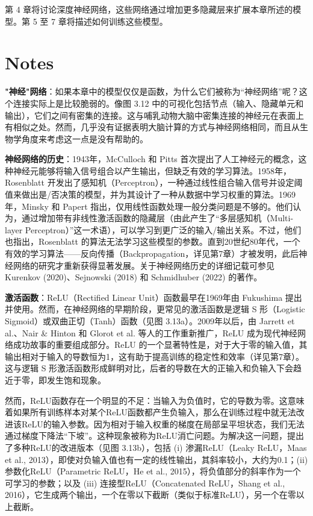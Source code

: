第 4 章将讨论深度神经网络，这些网络通过增加更多隐藏层来扩展本章所述的模型。第 5 至 7 章将描述如何训练这些模型。

\section{Notes}

\textbf{"神经"网络}：如果本章中的模型仅仅是函数，为什么它们被称为“神经网络”呢？这个连接实际上是比较脆弱的。像图 3.12 中的可视化包括节点（输入、隐藏单元和输出），它们之间有密集的连接。这与哺乳动物大脑中密集连接的神经元在表面上有相似之处。然而，几乎没有证据表明大脑计算的方式与神经网络相同，而且从生物学角度来考虑这一点是没有帮助的。

\textbf{神经网络的历史}：1943年，McCulloch 和 Pitts 首次提出了人工神经元的概念，这种神经元能够将输入信号组合以产生输出，但缺乏有效的学习算法。1958年，Rosenblatt 开发出了感知机（Perceptron），一种通过线性组合输入信号并设定阈值来做出是/否决策的模型，并为其设计了一种从数据中学习权重的算法。1969年，Minsky 和 Papert 指出，仅用线性函数处理一般分类问题是不够的。他们认为，通过增加带有非线性激活函数的隐藏层（由此产生了“多层感知机（Multi-layer Perceptron）”这一术语），可以学习到更广泛的输入/输出关系。不过，他们也指出，Rosenblatt 的算法无法学习这些模型的参数。直到20世纪80年代，一个有效的学习算法——反向传播（Backpropagation，详见第7章）才被发明，此后神经网络的研究才重新获得显著发展。关于神经网络历史的详细记载可参见 Kurenkov (2020)、Sejnowski (2018) 和 Schmidhuber (2022) 的著作。

\textbf{激活函数}：ReLU（Rectified Linear Unit）函数最早在1969年由 Fukushima 提出并使用。然而，在神经网络的早期阶段，更常见的激活函数是逻辑 S 形（Logistic Sigmoid）或双曲正切（Tanh）函数（见图 3.13a）。2009年以后，由 Jarrett et al.、Nair \& Hinton 和 Glorot et al. 等人的工作重新推广，ReLU 成为现代神经网络成功故事的重要组成部分。ReLU 的一个显著特性是，对于大于零的输入值，其输出相对于输入的导数恒为1，这有助于提高训练的稳定性和效率（详见第7章）。这与逻辑 S 形激活函数形成鲜明对比，后者的导数在大的正输入和负输入下会趋近于零，即发生饱和现象。

然而，ReLU函数存在一个明显的不足：当输入为负值时，它的导数为零。这意味着如果所有训练样本对某个ReLU函数都产生负输入，那么在训练过程中就无法改进该ReLU的输入参数。因为相对于输入权重的梯度在局部呈平坦状态，我们无法通过梯度下降法“下坡”。这种现象被称为ReLU消亡问题。为解决这一问题，提出了多种ReLU的改进版本（见图 3.13b），包括 (i) 渗漏ReLU（Leaky ReLU，Maas et al., 2013），即使对负输入值也有一定的线性输出，其斜率较小，大约为0.1；(ii) 参数化ReLU（Parametric ReLU，He et al., 2015），将负值部分的斜率作为一个可学习的参数；以及 (iii) 连接型ReLU（Concatenated ReLU，Shang et al., 2016），它生成两个输出，一个在零以下截断（类似于标准ReLU），另一个在零以上截断。

